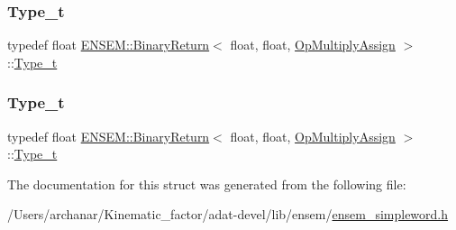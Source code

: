 \mbox{\label{structENSEM_1_1BinaryReturn_3_01float_00_01float_00_01OpMultiplyAssign_01_4_a9d7718a73ef422d2fb14226dbef89f9a}} 
\subsubsection{\texorpdfstring{Type\_t}{Type\_t}\hspace{0.1cm}{\footnotesize\ttfamily [2/3]}}
{\footnotesize\ttfamily typedef float \mbox{\hyperlink{structENSEM_1_1BinaryReturn}{E\+N\+S\+E\+M\+::\+Binary\+Return}}$<$ float, float, \mbox{\hyperlink{structENSEM_1_1OpMultiplyAssign}{Op\+Multiply\+Assign}} $>$\+::\mbox{\hyperlink{structENSEM_1_1BinaryReturn_3_01float_00_01float_00_01OpMultiplyAssign_01_4_a9d7718a73ef422d2fb14226dbef89f9a}{Type\+\_\+t}}}

\mbox{\label{structENSEM_1_1BinaryReturn_3_01float_00_01float_00_01OpMultiplyAssign_01_4_a9d7718a73ef422d2fb14226dbef89f9a}} 
\subsubsection{\texorpdfstring{Type\_t}{Type\_t}\hspace{0.1cm}{\footnotesize\ttfamily [3/3]}}
{\footnotesize\ttfamily typedef float \mbox{\hyperlink{structENSEM_1_1BinaryReturn}{E\+N\+S\+E\+M\+::\+Binary\+Return}}$<$ float, float, \mbox{\hyperlink{structENSEM_1_1OpMultiplyAssign}{Op\+Multiply\+Assign}} $>$\+::\mbox{\hyperlink{structENSEM_1_1BinaryReturn_3_01float_00_01float_00_01OpMultiplyAssign_01_4_a9d7718a73ef422d2fb14226dbef89f9a}{Type\+\_\+t}}}



The documentation for this struct was generated from the following file\+:\begin{DoxyCompactItemize}
\item 
/\+Users/archanar/\+Kinematic\+\_\+factor/adat-\/devel/lib/ensem/\mbox{\hyperlink{adat-devel_2lib_2ensem_2ensem__simpleword_8h}{ensem\+\_\+simpleword.\+h}}\end{DoxyCompactItemize}
